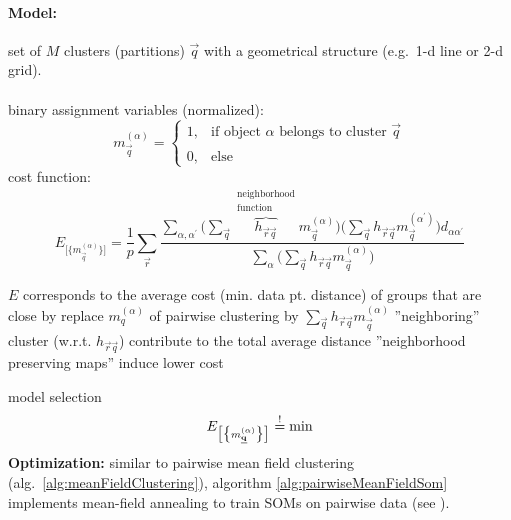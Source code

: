 \paragraph{Model:} set of $M$ clusters (partitions) $\vec{q}$ with a geometrical
structure (e.g.\ 1-d line or 2-d grid). 
\\\\
binary assignment variables (normalized):
\begin{equation}
	m_{\vec{q}}^{(\alpha)} = \left\{ \begin{array}{ll}
		1, & \text{if object } \alpha \text{ belongs to cluster } \vec q \\\\
		0, & \text{else}
	\end{array} \right.
\end{equation}
cost function:
\begin{equation}
	E_{\big[ \big\{ m_{\vec{q}}^{(\alpha)} \big\} \big]}
	= \frac{1}{p} \sum\limits_{\vec{r}} 
		\frac{ \sum\limits_{\alpha, \alpha^{'}} 
		\Big( \sum\limits_{\vec{q}} 
		\overbrace{h_{\vec{r} \vec{q}}}^{ \substack{\text{neighborhood} \\
		\text{function}}} 
		m_{\vec{q}}^{(\alpha)} \Big) \Big( \sum\limits_{\vec{q}}
		h_{\vec{r} \vec{q}} m_{\vec{q}}^{(\alpha^{'})} \Big)
		d_{\alpha \alpha^{'}} }{
			\sum\limits_{\alpha} \Big( \sum\limits_{\vec{q}}
			h_{\vec{r} \vec{q}} m_{\vec{q}}^{(\alpha)}\Big)}
\end{equation}
\begin{itemize}
      \itl $E$ corresponds to the average cost (min. data pt. distance) of groups that are close by
	\itl replace $m_q^{(\alpha)}$ of pairwise clustering by 
		$\sum\limits_{\vec{q}} h_{\vec{r} \vec{q}} 
		m_{\vec{q}}^{(\alpha)}$
	\itl ''neighboring'' cluster (w.r.t. $h_{\vec{r} \vec{q}}$) contribute
		to the total average distance
	\itl ''neighborhood preserving maps'' induce lower cost
\end{itemize}
model selection
\begin{equation}
	E_{ \big[ \big\{ m_{\underline{\mathbf{q}}}^{(\alpha)} \big\} \big] }
	\stackrel{\mathrm{!}}{=} \min
\end{equation}
\textbf{Optimization:} similar to pairwise mean field clustering
(alg.~\ref{alg:meanFieldClustering}), algorithm
\ref{alg:pairwiseMeanFieldSom} implements mean-field annealing to
train SOMs on pairwise data (see \cite{GraepelObermayer1999}).

